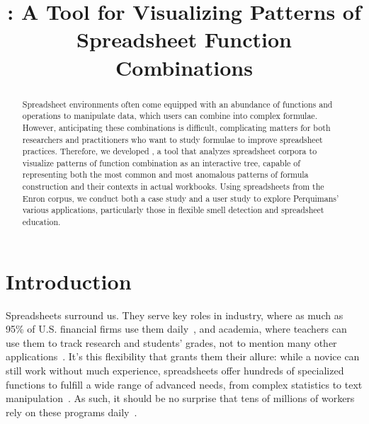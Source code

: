 \documentclass[conference]{IEEEtran}
\newcommand{\toolnameposs}{Perquimans' }
\begin{document}
 \title{\toolnameend: A Tool for Visualizing Patterns of
		Spreadsheet Function Combinations}
	
	
	\author{ 
		}
	
	
	\maketitle
	
	\begin{abstract} Spreadsheet environments often come equipped with an abundance
		of functions and operations to manipulate data, which users can combine into
		complex formulae. However, anticipating these
		combinations is difficult, complicating matters for both researchers and
		practitioners who want to study formulae to improve spreadsheet practices.
		Therefore, we developed \toolnameend, a tool that analyzes spreadsheet corpora
		to visualize patterns of function combination as an interactive tree, capable
		of representing both the most common and most anomalous patterns of formula
		construction and their contexts in actual workbooks. Using spreadsheets from
		the Enron corpus, we conduct both a case study and a user study to explore
		\toolnameposs various applications, particularly those in flexible smell
		detection and spreadsheet education.
		
	\end{abstract}
	
	\section{Introduction} Spreadsheets surround us. They serve key roles in
	industry, where as much as 95\% of U.S. financial firms use them
	daily~\cite{panko2008sarbanes}, and academia, where teachers can use them to
	track research and students' grades, not to mention many other
	applications~\cite{ko2011state}. It's this flexibility that grants them their
	allure: while a novice can still work without much experience, spreadsheets
	offer hundreds of specialized functions to fulfill a wide range of advanced
	needs, from complex statistics to text
	manipulation~\cite{nardi1990spreadsheet}. As such, it should be no surprise
	that tens of millions of workers rely on these programs
	daily~\cite{scaffidi2005estimating}.
	
\end{document}
